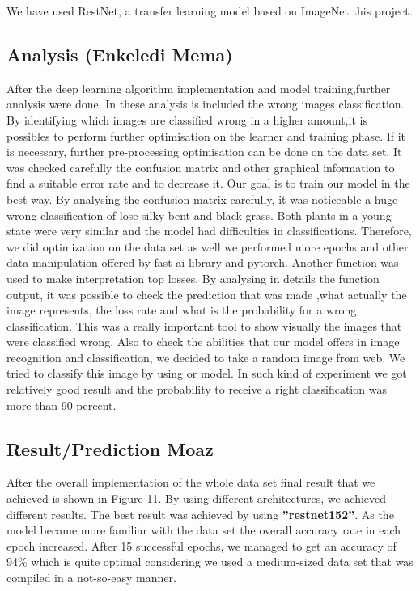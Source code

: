 \documentclass[english]{lni}
\begin{document}
We have used RestNet\cite{he2016deep}, a transfer learning model based on ImageNet\cite{deng2009imagenet} this project. 

\subsection{Analysis (Enkeledi Mema)}
After the deep learning algorithm implementation and model training,further analysis were done. In these analysis is included the wrong images classification. By identifying which images are classified wrong in a higher amount,it is possibles to perform further optimisation on the learner and training phase. If it is necessary, further pre-processing optimisation can be done on the data set. It was checked carefully the confusion matrix and other graphical information to find a suitable error rate and to decrease it. Our goal is to train our model in the best way. By analysing the confusion matrix carefully, it was noticeable a huge wrong classification of lose silky bent and black grass. Both plants in a young state were very similar and the model had difficulties in classifications. Therefore, we did optimization on the data set as well we performed more epochs and other data manipulation offered by fast-ai library and pytorch. Another function was used to make interpretation top losses. By analysing in details the function output, it was possible to check the prediction that was made ,what actually the image represents, the loss rate and what is the probability for a wrong classification. This was a really important tool to show visually the images that were classified wrong. Also to check the abilities that our model offers in image recognition and classification, we decided to take a random image from web. We tried to classify this image by using or model. In such kind of experiment we got relatively good result and the probability to receive a right classification was more than 90 percent.          


\subsection{Result/Prediction Moaz}
After the overall implementation of the whole data set final result that we achieved is shown in Figure 11. By using different architectures, we achieved different results. The best result was achieved by using \textbf{''restnet152''}. As the model became more familiar with the data set the overall accuracy rate in each epoch increased. After 15 successful epochs, we managed to get an accuracy of 94\% which is quite optimal considering we used a medium-sized data set that was compiled in a not-so-easy manner. 
\end{document}
